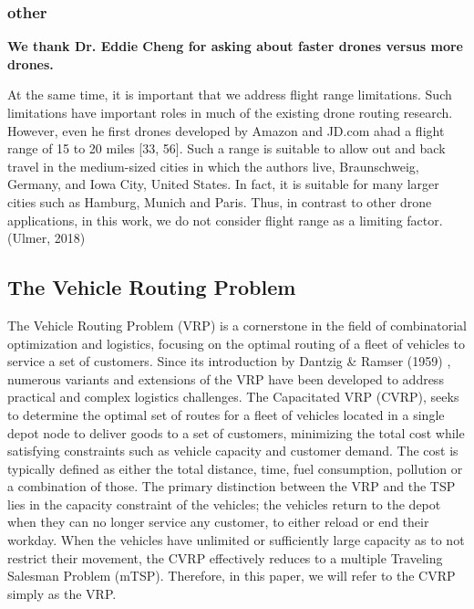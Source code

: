 \documentclass{article}
\begin{document}
	\subsubsection{other}
	\textbf{We thank Dr. Eddie Cheng for asking about faster drones versus more drones.}
	\par
	At the same time, it is important that we address flight range limitations. Such limitations have important roles in much of the existing drone routing research. However, even he first drones developed by Amazon and JD.com ahad a flight range of 15 to 20 miles [33, 56]. Such a range is suitable to allow out and back travel in the medium-sized cities in which the authors live, Braunschweig, Germany, and Iowa City, United States. In fact, it is suitable for many larger cities such as Hamburg, Munich and Paris. Thus, in contrast to other drone applications, in this work, we do not consider flight range as a limiting factor. (Ulmer, 2018)
	
	\subsection{The Vehicle Routing Problem}
	The Vehicle Routing Problem (VRP) is a cornerstone in the field of combinatorial optimization and logistics, focusing on the optimal routing of a fleet of vehicles to service a set of customers. Since its introduction by Dantzig \& Ramser (1959) \cite{VRP1959}, numerous variants and extensions of the VRP have been developed to address practical and complex logistics challenges. The Capacitated VRP (CVRP), seeks to determine the optimal set of routes for a fleet of vehicles located in a single depot node to deliver goods to a set
	of customers, minimizing the total cost while satisfying constraints such as vehicle capacity and customer demand. The cost is typically defined as either the total distance, time, fuel consumption, pollution or a combination of those. The primary distinction between the VRP and the TSP lies in the capacity constraint of the vehicles; the vehicles  return to the depot when they can no longer service any customer, to either reload or end their workday. When the vehicles have unlimited or sufficiently large capacity as to not restrict their movement, the CVRP effectively reduces to a multiple Traveling Salesman Problem (mTSP). Therefore, in this paper, we will refer to the CVRP simply as the VRP. 
	\par
\end{document}
